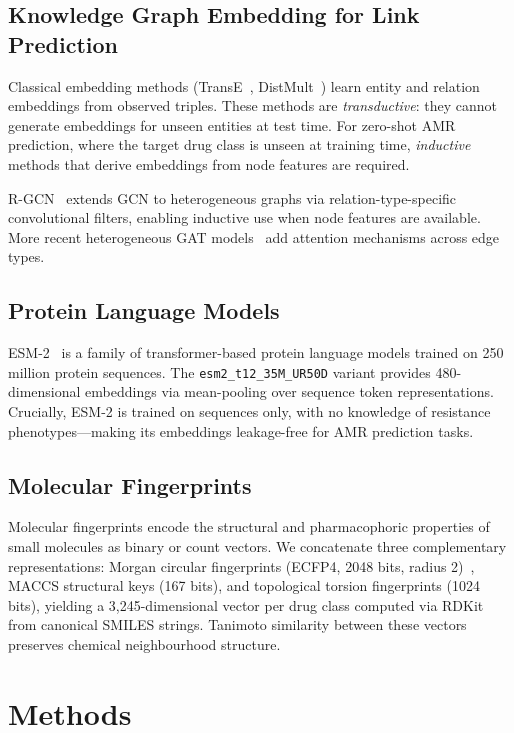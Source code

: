 \documentclass[conference]{IEEEtran}
\begin{document}
\subsection{Knowledge Graph Embedding for Link Prediction}
Classical embedding methods (TransE~\cite{bordes2013transe},
DistMult~\cite{yang2015distmult}) learn entity and relation embeddings from
observed triples. These methods are \emph{transductive}: they cannot generate
embeddings for unseen entities at test time. For zero-shot AMR prediction,
where the target drug class is unseen at training time, \emph{inductive}
methods that derive embeddings from node features are required.

R-GCN~\cite{schlichtkrull2018rgcn} extends GCN to heterogeneous graphs via
relation-type-specific convolutional filters, enabling inductive use when node
features are available. More recent heterogeneous GAT
models~\cite{yun2019heterogeneous} add attention mechanisms across edge types.

\subsection{Protein Language Models}
ESM-2~\cite{lin2023esm2} is a family of transformer-based protein language
models trained on 250 million protein sequences. The
\texttt{esm2\_t12\_35M\_UR50D} variant provides 480-dimensional embeddings via
mean-pooling over sequence token representations. Crucially, ESM-2 is trained
on sequences only, with no knowledge of resistance phenotypes---making its
embeddings leakage-free for AMR prediction tasks.

\subsection{Molecular Fingerprints}
Molecular fingerprints encode the structural and pharmacophoric properties of
small molecules as binary or count vectors. We concatenate three
complementary representations: Morgan circular fingerprints
(ECFP4, 2048 bits, radius 2)~\cite{rogers2010ecfp}, MACCS structural keys
(167 bits), and topological torsion fingerprints (1024 bits), yielding a
3,245-dimensional vector per drug class computed via
RDKit~\cite{landrum2016rdkit} from canonical SMILES strings. Tanimoto
similarity between these vectors preserves chemical neighbourhood structure.

\section{Methods}
\label{sec:methods}
\end{document}
